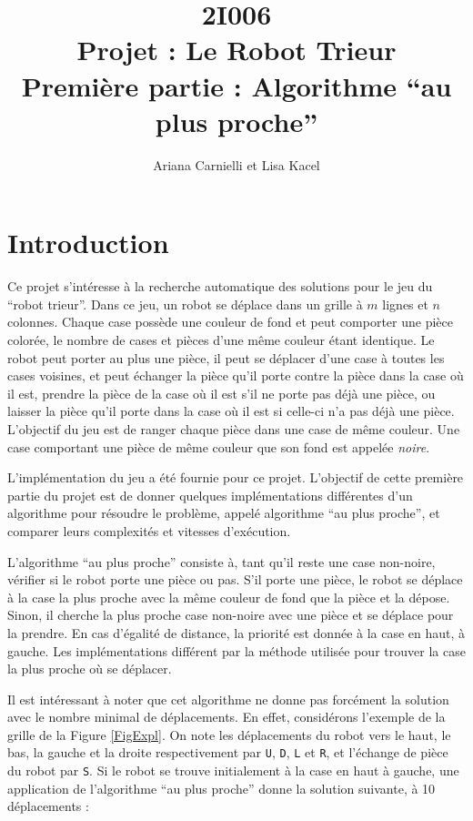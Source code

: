 \documentclass[a4paper,12pt]{article}
\numberwithin{equation}{section}
\begin{document}
\title{2I006 \\ Projet : Le Robot Trieur \\ Première partie : Algorithme ``au plus proche''}
\author{Ariana Carnielli et Lisa Kacel}
\date{}

\maketitle

\section{Introduction}

Ce projet s'intéresse à la recherche automatique des solutions pour le jeu du ``robot trieur''. Dans ce jeu, un robot se déplace dans un grille à $m$ lignes et $n$ colonnes. Chaque case possède une couleur de fond et peut comporter une pièce colorée, le nombre de cases et pièces d'une même couleur étant identique. Le robot peut porter au plus une pièce, il peut se déplacer d'une case à toutes les cases voisines, et peut échanger la pièce qu'il porte contre la pièce dans la case où il est, prendre la pièce de la case où il est s'il ne porte pas déjà une pièce, ou laisser la pièce qu'il porte dans la case où il est si celle-ci n'a pas déjà une pièce. L'objectif du jeu est de ranger chaque pièce dans une case de même couleur. Une case comportant une pièce de même couleur que son fond est appelée \emph{noire}.

L'implémentation du jeu a été fournie pour ce projet. L'objectif de cette première partie du projet est de donner quelques implémentations différentes d'un algorithme pour résoudre le problème, appelé algorithme ``au plus proche'', et comparer leurs complexités et vitesses d'exécution.

L'algorithme ``au plus proche'' consiste à, tant qu'il reste une case non-noire, vérifier si le robot porte une pièce ou pas. S'il porte une pièce, le robot se déplace à la case la plus proche avec la même couleur de fond que la pièce et la dépose. Sinon, il cherche la plus proche case non-noire avec une pièce et se déplace pour la prendre. En cas d'égalité de distance, la priorité est donnée à la case en haut, à gauche. Les implémentations différent par la méthode utilisée pour trouver la case la plus proche où se déplacer.

Il est intéressant à noter que cet algorithme ne donne pas forcément la solution avec le nombre minimal de déplacements. En effet, considérons l'exemple de la grille de la Figure \ref{FigExpl}. On note les déplacements du robot vers le haut, le bas, la gauche et la droite respectivement par \texttt{U}, \texttt{D}, \texttt{L} et \texttt{R}, et l'échange de pièce du robot par \texttt{S}. Si le robot se trouve initialement à la case en haut à gauche, une application de l'algorithme ``au plus proche'' donne la solution suivante, à 10 déplacements :
\end{document}
